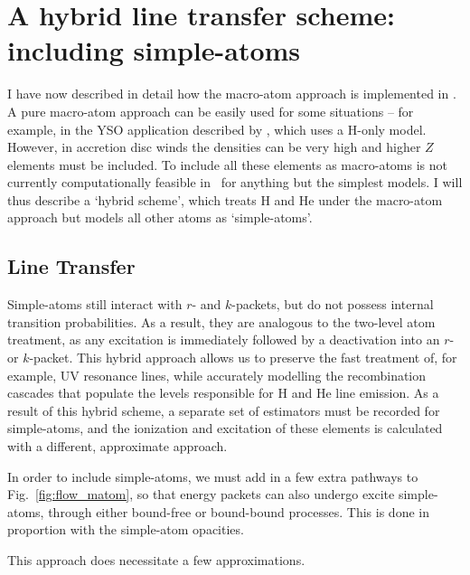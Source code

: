 \section{A hybrid line transfer scheme: including simple-atoms}

I have now described in detail how the macro-atom approach is 
implemented in \py. A pure macro-atom approach can be easily used for
some situations -- for example, in the YSO application described by 
\cite{simmacro2005}, which uses a H-only model. However, in accretion
disc winds the densities can be very high and higher $Z$ elements must be 
included. To include all these elements as macro-atoms is not
currently computationally feasible in \py\ for anything but the simplest
models. I will thus describe a `hybrid scheme', which treats H and He
under the macro-atom approach but models all other atoms 
as `simple-atoms'. 

\subsection{Line Transfer}

Simple-atoms still interact with $r$- and $k$-packets,
but do not possess internal transition probabilities. As a result,
they are analogous to the two-level atom treatment, as any excitation
is immediately followed by a deactivation into an $r$- or $k$-packet.
This hybrid approach allows us to preserve the fast treatment 
of, for example, UV resonance lines, while accurately 
modelling the recombination cascades that populate the levels 
responsible for H and He line emission. As a result of this hybrid
scheme, a separate set of estimators must be recorded for simple-atoms, 
and the ionization and excitation of these elements is calculated 
with a different, approximate approach.

In order to include simple-atoms, we must add in a few extra pathways
to Fig.~\ref{fig:flow_matom}, so that energy packets can also
undergo excite simple-atoms, through either bound-free or bound-bound
processes. This is done in proportion with the simple-atom opacities.

This approach does necessitate a few approximations.

